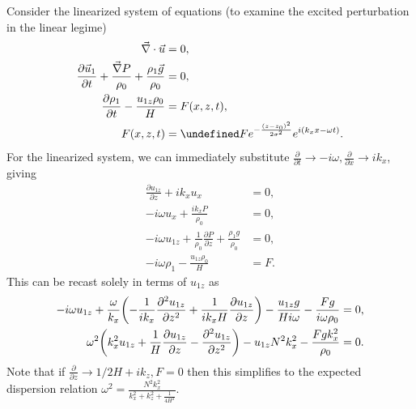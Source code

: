 \documentclass[11pt,
        usenames, %
        dvipsnames %
    ]{report}
\newcommand*{\pd}[2]{\frac{\partial#1}{\partial#2}}
\newcommand*{\ptd}[2]{\frac{\partial^2 #1}{\partial#2^2}}
\let\Re\undefined
\DeclareMathOperator{\Re}{Re}
\DeclarePairedDelimiter\p{\lparen}{\rparen}
\begin{document}
Consider the linearized system of equations (to examine the excited perturbation
in the linear legime)
\begin{subequations}\label{se:vol_drive}
    \begin{align}
        \vec{\nabla} \cdot \vec{u} &= 0,\\
        \pd{\vec{u}_1}{t} + \frac{\vec{\nabla}P}{\rho_0}
            + \frac{\rho_1 \vec{g}}{\rho_0}
            &= 0,\\
        \pd{\rho_1}{t} - \frac{u_{1z} \rho_0}{H}
            &= F(x, z, t),\\
        F(x, z, t) &= \Re Fe^{-\frac{(z - z_0)^2}{2\sigma^2}}
            e^{i\p*{k_xx - \omega t}}.
    \end{align}
\end{subequations}
For the linearized system, we can immediately substitute $\pd{}{t} \to -i\omega,
\pd{}{x} \to ik_x$, giving
\begin{align*}
    \pd{u_{1z}}{z} + ik_xu_x &= 0,\\
    -i\omega u_x + \frac{ik_xP}{\rho_0} &= 0,\\
    -i\omega u_{1z} + \frac{1}{\rho_0}\pd{P}{z} + \frac{\rho_1 g}{\rho_0} &= 0,\\
    -i\omega \rho_1 - \frac{u_{1z}\rho_0}{H} &= F.
\end{align*}
This can be recast solely in terms of $u_{1z}$ as
\begin{align*}
    -i\omega u_{1z} + \frac{\omega}{k_x}\p*{-\frac{1}{ik_x}\ptd{u_{1z}}{z}
        + \frac{1}{ik_xH}\pd{u_{1z}}{z}} - \frac{u_{1z}g}{Hi\omega}
        - \frac{Fg}{i\omega \rho_0} = 0,\\
    \omega^2\p*{
        k_x^2u_{1z} + \frac{1}{H}\pd{u_{1z}}{z} - \ptd{u_{1z}}{z}
    } - u_{1z}N^2k_x^2 - \frac{Fgk_x^2}{\rho_0} = 0.
\end{align*}
Note that if $\pd{}{z} \to 1/2H + ik_z, F = 0$ then this simplifies to the expected
dispersion relation $\omega^2 = \frac{N^2k_x^2}{k_x^2 + k_z^2 +
\frac{1}{4H^2}}$.
\end{document}

